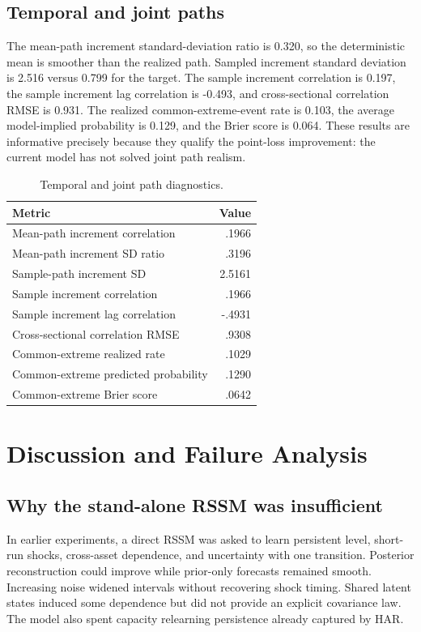\documentclass[11pt]{article}
\begin{document}
\subsection{Temporal and joint paths}
The mean-path increment standard-deviation ratio is 0.320, so the deterministic mean is smoother than the realized path. Sampled increment standard deviation is 2.516 versus 0.799 for the target. The sample increment correlation is 0.197, the sample increment lag correlation is -0.493, and cross-sectional correlation RMSE is 0.931. The realized common-extreme-event rate is 0.103, the average model-implied probability is 0.129, and the Brier score is 0.064. These results are informative precisely because they qualify the point-loss improvement: the current model has not solved joint path realism.
\begin{table}[h]\centering\caption{Temporal and joint path diagnostics.}\begin{tabular}{lr}\toprule Metric & Value\\\midrule Mean-path increment correlation & .1966\\ Mean-path increment SD ratio & .3196\\ Sample-path increment SD & 2.5161\\ Sample increment correlation & .1966\\ Sample increment lag correlation & -.4931\\ Cross-sectional correlation RMSE & .9308\\ Common-extreme realized rate & .1029\\ Common-extreme predicted probability & .1290\\ Common-extreme Brier score & .0642\\\bottomrule\end{tabular}\end{table}

\section{Discussion and Failure Analysis}
\subsection{Why the stand-alone RSSM was insufficient}
In earlier experiments, a direct RSSM was asked to learn persistent level, short-run shocks, cross-asset dependence, and uncertainty with one transition. Posterior reconstruction could improve while prior-only forecasts remained smooth. Increasing noise widened intervals without recovering shock timing. Shared latent states induced some dependence but did not provide an explicit covariance law. The model also spent capacity relearning persistence already captured by HAR.
\end{document}
